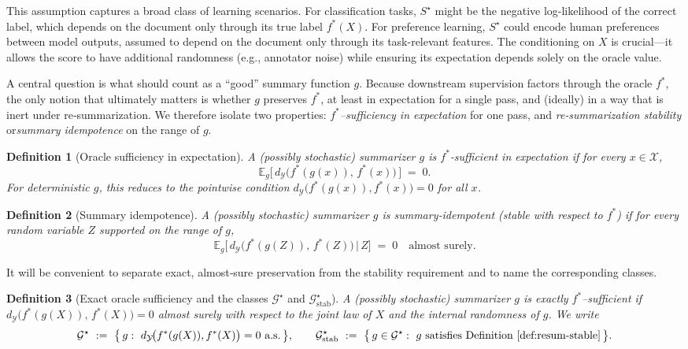 \documentclass[11pt]{article}
\newtheorem{definition}{Definition}
\newcommand{\Strings}{\mathcal{X}}       %
\newcommand{\Y}{\mathcal{Y}}               %
\newcommand{\fstar}{f^*}               %
\newcommand{\sstar}{S^\star}               %
\newcommand{\Gstar}{\mathcal{G}^\star}     %
\newcommand{\E}{\mathbb{E}}
\newcommand{\metric}{d_{\Y}}
\newcommand{\Eg}{\E_g}     %
\begin{document}
This assumption captures a broad class of learning scenarios. For classification tasks, $\sstar$ might be the negative log-likelihood of the correct label, which depends on the document only through its true label $\fstar(X)$. For preference learning, $\sstar$ could encode human preferences between model outputs, assumed to depend on the document only through its task-relevant features. The conditioning on $X$ is crucial—it allows the score to have additional randomness (e.g., annotator noise) while ensuring its expectation depends solely on the oracle value.


A central question is what should count as a ``good'' summary function $g$. Because downstream supervision factors through the oracle $\fstar$, the only notion that ultimately matters is whether $g$ preserves $\fstar$, at least in expectation for a single pass, and (ideally) in a way that is inert under re‑summarization. We therefore isolate two properties: \emph{$\fstar$–sufficiency in expectation} for one pass, and \emph{re‑summarization stability} or\emph{summary idempotence} on the range of $g$.

\begin{definition}[Oracle sufficiency in expectation]\label{def:expect-suff}
A (possibly stochastic) summarizer $g$ is \emph{$\fstar$‑sufficient in expectation}
if for every $x\in\Strings$,
\[
\Eg\!\big[\,\metric\big(\fstar(g(x)),\,\fstar(x)\big)\,\big]\;=\;0.
\]
For deterministic $g$, this reduces to the pointwise condition
$\metric\big(\fstar(g(x)),\fstar(x)\big)=0$ for all $x$.
\end{definition}

\begin{definition}[Summary idempotence]\label{def:resum-stable}
A (possibly stochastic) summarizer $g$ is \emph{summary‑idempotent} (stable with respect to $\fstar$) if for every random variable $Z$ supported on the range of $g$,
\[
\Eg\!\big[\,\metric\big(\fstar(g(Z)),\,\fstar(Z)\big)\,\big|\,Z\big]\;=\;0
\quad\text{almost surely.}
\]
\end{definition}

It will be convenient to separate exact, almost‑sure preservation from the stability requirement and to name the corresponding classes.


\begin{definition}[Exact oracle sufficiency and the classes $\Gstar$ and $\Gstar_{\mathrm{stab}}$]\label{def:exact-suff-stable}
A (possibly stochastic) summarizer $g$ is \emph{exactly $\fstar$–sufficient} if
$\metric\!\big(\fstar(g(X)),\,\fstar(X)\big)=0$ almost surely with respect to the joint law of $X$ and the internal randomness of $g$.
We write
\[
\Gstar\ :=\ \bigl\{\,g:\ \metric\!\big(\fstar(g(X)),\fstar(X)\big)=0\ \text{a.s.}\,\bigr\},\qquad
\Gstar_{\mathrm{stab}}\ :=\ \bigl\{\,g\in\Gstar:\ g\ \text{satisfies Definition~\ref{def:resum-stable}}\,\bigr\}.
\]
\end{definition}
\end{document}
